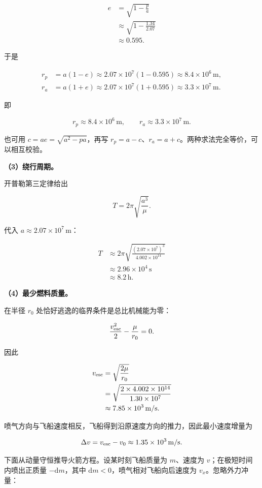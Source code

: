 \documentclass[12pt,a4paper,UTF8]{ctexart}
\begin{document}
\[
\begin{aligned}
e&=\sqrt{1-\frac pa}\\
&\approx\sqrt{1-\frac{1.34}{2.07}}\\
&\approx0.595.
\end{aligned}
\]

于是

\[
\begin{aligned}
r_p&=a(1-e)\approx2.07\times10^7(1-0.595)
\approx8.4\times10^6\,\mathrm m,\\
r_a&=a(1+e)\approx2.07\times10^7(1+0.595)
\approx3.3\times10^7\,\mathrm m.
\end{aligned}
\]

即

\[\boxed{r_p\approx8.4\times10^6\,\mathrm m,\qquad r_a\approx3.3\times10^7\,\mathrm m}.\]

也可用 \(c=ae=\sqrt{a^2-pa}\)，再写
\(r_p=a-c\)、\(r_a=a+c\)。两种求法完全等价，可以相互校验。

\textbf{（3）绕行周期。}

开普勒第三定律给出

\[T=2\pi\sqrt{\frac{a^3}{\mu}}.\]

代入 \(a\approx2.07\times10^7\,\mathrm m\)：

\[
\begin{aligned}
T&\approx2\pi\sqrt{\frac{(2.07\times10^7)^3}{4.002\times10^{14}}}\\
&\approx2.96\times10^4\,\mathrm s\\
&\approx\boxed{8.2\,\mathrm h}.
\end{aligned}
\]

\textbf{（4）最少燃料质量。}

在半径 \(r_0\) 处恰好逃逸的临界条件是总比机械能为零：

\[\frac{v_{\rm esc}^2}{2}-\frac\mu{r_0}=0.\]

因此

\[
\begin{aligned}
v_{\rm esc}&=\sqrt{\frac{2\mu}{r_0}}\\
&=\sqrt{\frac{2\times4.002\times10^{14}}{1.30\times10^7}}\\
&\approx7.85\times10^3\,\mathrm{m/s}.
\end{aligned}
\]

喷气方向与飞船速度相反，飞船得到沿原速度方向的推力，因此最小速度增量为

\[\Delta v=v_{\rm esc}-v_0\approx1.35\times10^3\,\mathrm{m/s}.\]

下面从动量守恒推导火箭方程。设某时刻飞船质量为 \(m\)、速度为
\(v\)；在极短时间内喷出正质量 \(-\mathrm dm\)，其中
\(\mathrm dm<0\)，喷气相对飞船向后速度为 \(v_x\)。忽略外力冲量：
\end{document}

